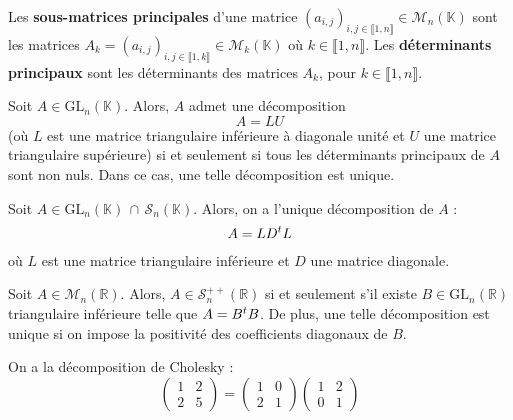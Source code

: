   \begin{definition}
    Les \textbf{sous-matrices principales} d'une matrice $(a_{i,j})_{i,j \in \llbracket 1, n \rrbracket} \in \mathcal{M}_n(\mathbb{K})$ sont les matrices $A_k = (a_{i,j})_{i,j \in \llbracket 1, k \rrbracket} \in \mathcal{M}_k(\mathbb{K})$ où $k \in \llbracket 1, n \rrbracket$. Les \textbf{déterminants principaux} sont les déterminants des matrices $A_k$, pour $k \in \llbracket 1, n \rrbracket$.
  \end{definition}
  
  \begin{theorem}
    \label{162-2}
    Soit $A \in \mathrm{GL}_n(\mathbb{K})$. Alors, $A$ admet une décomposition
    \[ A = LU \]
    (où $L$ est une matrice triangulaire inférieure à diagonale unité et $U$ une matrice triangulaire supérieure) si et seulement si tous les déterminants principaux de $A$ sont non nuls. Dans ce cas, une telle décomposition est unique.
  \end{theorem}
  
  \begin{corollary}
    Soit $A \in \mathrm{GL}_n(\mathbb{K}) \, \cap \, \mathcal{S}_n(\mathbb{K})$. Alors, on a l'unique décomposition de $A$ :
    \[ A = LD\mathstrut ^t L \]
    où $L$ est une matrice triangulaire inférieure et $D$ une matrice diagonale.
  \end{corollary}
  
  \begin{application}
    Soit $A \in \mathcal{M}_n(\mathbb{R})$. Alors, $A \in \mathcal{S}_n^{++}(\mathbb{R})$ si et seulement s'il existe $B \in \mathrm{GL}_n(\mathbb{R})$ triangulaire inférieure telle que $A = B\mathstrut ^t B$. De plus, une telle décomposition est unique si on impose la positivité des coefficients diagonaux de $B$.
  \end{application}
  
  
  \begin{example}
    On a la décomposition de Cholesky :
    \[ \begin{pmatrix} 1 & 2 \\ 2 & 5 \end{pmatrix} = \begin{pmatrix} 1 & 0 \\ 2 & 1 \end{pmatrix} \begin{pmatrix} 1 & 2 \\ 0 & 1 \end{pmatrix} \]
  \end{example}
  
